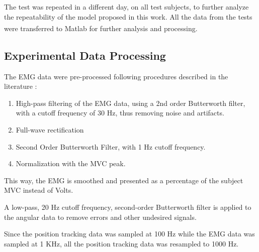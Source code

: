 \documentclass[letterpaper, 10 pt, conference]{ieeeconf}  %
\begin{document}
The test was repeated in a different day, on all test subjects, to further analyze the repeatability of the model proposed in this work. All the data from the tests were transferred to Matlab\textsuperscript{\textregistered} for further analysis and processing.

\subsection{Experimental Data Processing}

The EMG data were pre-processed following procedures described in the literature \cite{Rose20161112,Hayashibe20091621}:
\begin{enumerate}
\item High-pass filtering of the EMG data, using a 2nd order Butterworth filter, with a cutoff frequency of 30 Hz, thus removing noise and artifacts.
\item Full-wave rectification
\item Second Order Butterworth Filter, with 1 Hz cutoff frequency.
\item Normalization with the MVC peak.
\end{enumerate}

This way, the EMG is smoothed and presented as a percentage of the subject MVC instead of Volts.

A low-pass, 20 Hz cutoff frequency, second-order Butterworth filter is applied to the angular data to remove errors and other undesired signals.

Since the position tracking data was sampled at 100 Hz while the EMG data was sampled at 1 KHz, all the position tracking data was resampled to 1000 Hz.


\end{document}
